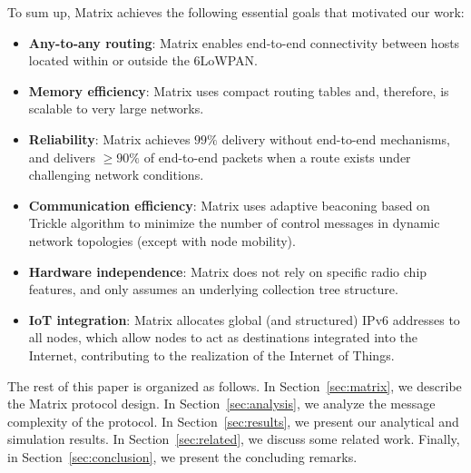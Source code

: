 To sum up, Matrix achieves the following essential goals that motivated our work:
\begin{itemize}
  \item \textbf{Any-to-any routing}: Matrix enables end-to-end connectivity
  between hosts located within or outside the 6LoWPAN.
  \item \textbf{Memory efficiency}: Matrix uses compact routing tables and,
  therefore, is scalable to very large networks.
  \item \textbf{Reliability}: Matrix achieves $99\%$ delivery
  without end-to-end mechanisms, and delivers $\geq 90\%$ of
  end-to-end packets when a route exists under challenging network conditions.
  \item \textbf{Communication efficiency}: Matrix uses adaptive beaconing based
  on Trickle algorithm \cite{Levis:2004} to minimize the number of control
  messages in dynamic network topologies (except with node mobility).
  \item \textbf{Hardware independence}: Matrix does not rely on specific radio
  chip features, and only assumes an underlying collection tree structure.
  \item \textbf{IoT integration}: Matrix allocates global (and structured) IPv6
addresses to all nodes, which allow nodes to act as destinations integrated into
the Internet, contributing to the realization of the Internet of Things.
\end{itemize}

The rest of this paper is organized as follows. In
Section~\ref{sec:matrix}, we describe the Matrix protocol design. In
Section~\ref{sec:analysis}, we analyze the message complexity of the protocol.
In Section~\ref{sec:results}, we present our analytical and simulation results.
In Section~\ref{sec:related}, we discuss some related work. Finally, in Section~\ref{sec:conclusion}, we present the concluding remarks.
